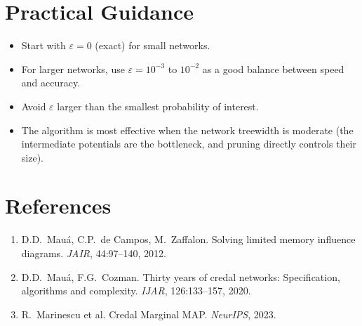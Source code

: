 \documentclass[11pt]{article}
\begin{document}
\section{Practical Guidance}

\begin{itemize}
  \item Start with $\varepsilon = 0$ (exact) for small networks.
  \item For larger networks, use $\varepsilon = 10^{-3}$ to $10^{-2}$ as a good
        balance between speed and accuracy.
  \item Avoid $\varepsilon$ larger than the smallest probability of interest.
  \item The algorithm is most effective when the network treewidth is moderate (the
        intermediate potentials are the bottleneck, and pruning directly controls
        their size).
\end{itemize}

\section{References}

\begin{enumerate}
\item D.D.\ Mau\'a, C.P.\ de Campos, M.\ Zaffalon. Solving limited memory influence
      diagrams. \emph{JAIR}, 44:97--140, 2012.
\item D.D.\ Mau\'a, F.G.\ Cozman. Thirty years of credal networks: Specification,
      algorithms and complexity. \emph{IJAR}, 126:133--157, 2020.
\item R.\ Marinescu et al. Credal Marginal MAP. \emph{NeurIPS}, 2023.
\end{enumerate}
\end{document}
